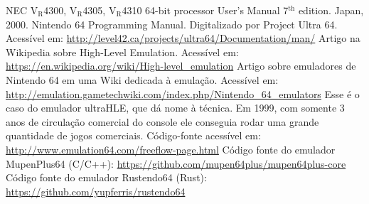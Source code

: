 \documentclass[12pt]{article}
\newcommand{\lowtext}[1]{$_{\text{#1}}$}
\begin{document}
\pagebreak
\begin{thebibliography}{1}
NEC V\lowtext{R}4300, V\lowtext{R}4305, V\lowtext{R}4310 64-bit 
processor User's Manual 7$^{\text{th}}$ edition. Japan, 2000.
Nintendo 64 Programming Manual. Digitalizado por Project Ultra 64. Acessível em: \url{http://level42.ca/projects/ultra64/Documentation/man/}
Artigo na Wikipedia sobre High-Level Emulation. Acessível em: \url{https://en.wikipedia.org/wiki/High-level_emulation}
Artigo sobre emuladores de Nintendo 64 em uma Wiki dedicada à emulação. Acessível em: \url{http://emulation.gametechwiki.com/index.php/Nintendo_64_emulators}
Esse é o caso do emulador ultraHLE, que dá nome à técnica. Em 1999, com somente 3 anos de circulação comercial do console ele conseguia rodar uma grande quantidade de jogos comerciais. Código-fonte acessível em: \url{http://www.emulation64.com/freeflow-page.html}
Código fonte do emulador MupenPlus64 (C/C++): \url{https://github.com/mupen64plus/mupen64plus-core}
Código fonte do emulador Rustendo64 (Rust): \url{https://github.com/yupferris/rustendo64}
\end{thebibliography}
\end{document}

